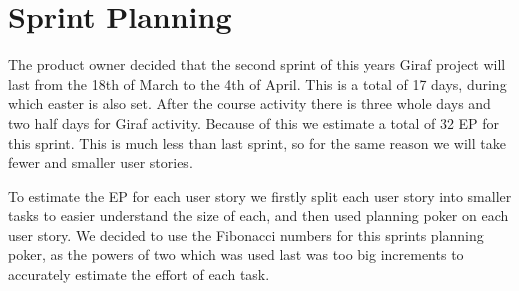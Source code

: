 \chapter{Sprint Planning}
The product owner decided that the second sprint of this years Giraf project will last from the 18th of March to the 4th of April.
This is a total of 17 days, during which easter is also set. 
After the course activity there is three whole days and two half days for Giraf activity. 
Because of this we estimate a total of 32 EP for this sprint.
This is much less than last sprint, so for the same reason we will take fewer and smaller user stories. 

To estimate the EP for each user story we firstly split each user story into smaller tasks to easier understand the size of each, and then used planning poker on each user story. 
We decided to use the Fibonacci numbers for this sprints planning poker, as the powers of two which was used last was too big increments to accurately estimate the effort of each task. 
